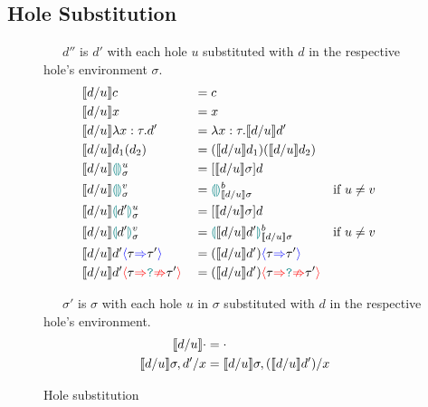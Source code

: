 \subsection{Hole Substitution}
\begin{figure}[H]
\small
{}\ \ \ $d''$ is $d'$ with each hole $u$ substituted with $d$ in the respective hole's environment $\sigma$.
\begin{align*}
&\contextualsub c &&= c\\
&\contextualsub x &&= x\\
&\contextualsub \lambda x:\tau.d' &&= \lambda x:\tau. \contextualsub d'\\
&\contextualsub d_1(d_2) &&= (\contextualsub d_1)(\contextualsub d_2)\\
&\contextualsub \hole^u_\sigma &&= [\contextualsub  \sigma]d\\
&\contextualsub \hole^v_\sigma &&= \hole^b_{\contextualsub \sigma} && \text{if $u \neq v$}\\
&\contextualsub \hole[d']^u_\sigma &&= [\contextualsub  \sigma]d\\
&\contextualsub \hole[d']^v_\sigma &&= \hole[\contextualsub d']^b_{\contextualsub \sigma} && \text{if $u \neq v$}\\
&\contextualsub d'\scast{\tau}{\tau'} &&= (\contextualsub d')\scast{\tau}{\tau'}\\
&\contextualsub d'\scasterror{\tau}{\tau'} &&= (\contextualsub d')\scasterror{\tau}{\tau'}\\
\end{align*}

\ \ \ $\sigma'$ is $\sigma$ with each hole $u$ in $\sigma$ substituted with $d$ in the respective hole's environment.
\begin{align*}
\contextualsub \cdot &= \cdot\\ 
\contextualsub \sigma, d'/x &= \contextualsub \sigma, (\contextualsub d')/x
\end{align*}
\caption{Hole substitution}
\label{fig:holesubstitution}
\end{figure} 
